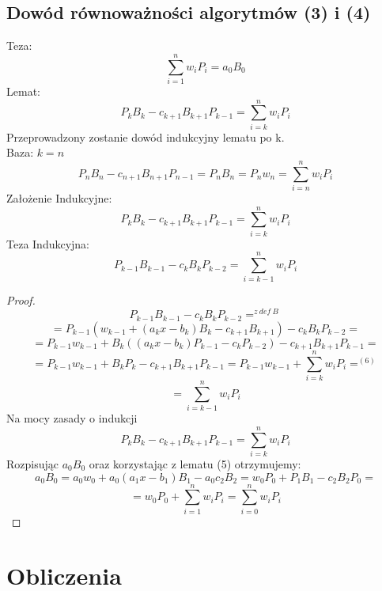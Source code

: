\documentclass{article}
\begin{document}
\subsection{Dowód równoważności algorytmów (3) i (4)}
Teza: $$\sum_{i=1}^{n} w_iP_i = a_0B_0$$
Lemat: 
\begin{equation}
    P_kB_k-c_{k+1}B_{k+1}P_{k-1}=\sum_{i=k}^{n} w_iP_i
\end{equation}
Przeprowadzony zostanie dowód indukcyjny lematu po k.\\
Baza: $k = n$
$$P_nB_n-c_{n+1}B_{n+1}P_{n-1}=P_nB_n=P_nw_n=\sum_{i=n}^{n} w_iP_i$$
Założenie Indukcyjne: 
\begin{equation}
    P_kB_k-c_{k+1}B_{k+1}P_{k-1}=\sum_{i=k}^{n} w_iP_i
\end{equation}
Teza Indukcyjna:
\begin{equation}
    P_{k-1}B_{k-1}-c_kB_kP_{k-2}=\sum_{i=k-1}^{n} w_iP_i
\end{equation}
\begin{proof}
    $$P_{k-1}B_{k-1}-c_kB_kP_{k-2}=^{z\ def\ B}$$
    $$=P_{k-1}(w_{k-1}+(a_kx-b_k)B_k-c_{k+1}B_{k+1})-c_kB_kP_{k-2}=$$
    $$=P_{k-1}w_{k-1}+B_k((a_kx-b_k)P_{k-1}-c_kP_{k-2})-c_{k+1}B_{k+1}P_{k-1}=$$
    $$=P_{k-1}w_{k-1}+B_kP_{k}-c_{k+1}B_{k+1}P_{k-1}=P_{k-1}w_{k-1}+\sum_{i=k}^{n} w_iP_i=^{(6)}$$
    $$=\sum_{i=k-1}^{n} w_iP_i$$
    \newpage
    Na mocy zasady o indukcji $$P_kB_k-c_{k+1}B_{k+1}P_{k-1}=\sum_{i=k}^{n} w_iP_i$$
    Rozpisując $a_0B_0$ oraz korzystając z lematu (5) otrzymujemy:
    $$a_0B_0=a_0w_0+a_0(a_1x-b_1)B_1-a_0c_2B_2=w_0P_0+P_1B_1-c_2B_2P_0=$$
    $$=w_0P_0+\sum_{i=1}^{n} w_iP_i=\sum_{i=0}^{n} w_iP_i$$
\end{proof}
\section{Obliczenia}
\end{document}
